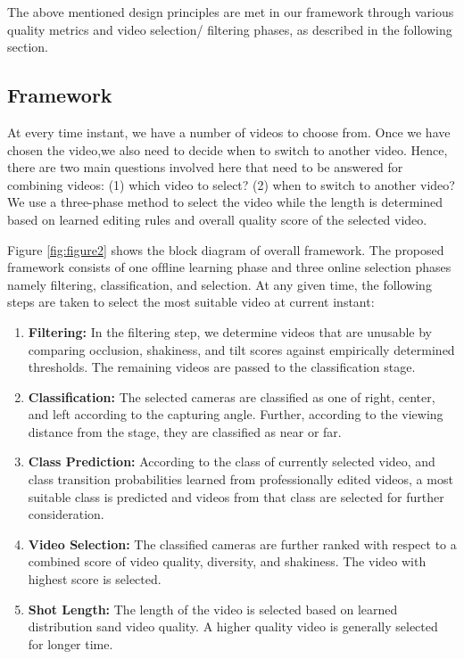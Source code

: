 \documentclass{sig-alternate}
\begin{document}
The above mentioned design principles are met in our framework through various quality metrics and video selection/ ﬁltering phases, as described in the following section.

\subsection{Framework}
At every time instant, we have a number of videos to choose from. Once we have chosen the video,we also need to decide when to switch to another video. Hence, there are two main questions involved here that need to be answered for combining videos: (1) which video to select? (2) when to switch to another video? We use a three-phase method to select the video while the length is determined based on learned editing rules and overall quality score of the selected video. 

Figure \ref{fig:figure2} shows the block diagram of overall framework. The proposed framework consists of one ofﬂine learning phase and three online selection phases namely ﬁltering, classiﬁcation, and selection. At any given time, the following steps are taken to select the most suitable video at current instant:

\begin{enumerate}
\item  \textbf{Filtering:} In the ﬁltering step, we determine videos that are unusable by comparing occlusion, shakiness, and tilt scores against empirically determined thresholds. The remaining videos are passed to the classiﬁcation stage.
\item \textbf{Classiﬁcation:} The selected cameras are classiﬁed as one of right, center, and left according to the capturing angle. Further, according to the viewing distance from the stage, they are classiﬁed as near or far.
\item \textbf{Class Prediction:} According to the class of currently selected video, and class transition probabilities learned from professionally edited videos, a most suitable class is predicted and videos from that class are selected for further consideration.
\item \textbf{Video Selection:} The classiﬁed cameras are further ranked with respect to a combined score of video quality, diversity, and shakiness. The video with highest score is selected.
\item \textbf{Shot Length:} The length of the video is selected based on learned distribution sand video quality. A higher quality video is generally selected for longer time.
\end{enumerate}
\end{document}
